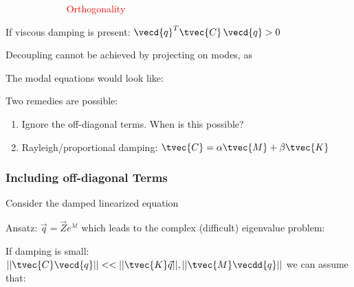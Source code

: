 \documentclass[10pt,a4paper]{scrartcl}
\begin{document}
\begin{multicols*}{2}

\textcolor{red}{$\qquad\qquad\qquad$ Orthogonality}


If viscous damping is present: $\vecd{q}^T\tvec{C}\,\vecd{q}>0$


Decoupling cannot be achieved by projecting on modes, as


The modal equations would look like:


Two remedies are possible:

\begin{enumerate}
\item Ignore the off-diagonal terms. When is this possible?
\item Rayleigh/proportional damping: $\tvec{C}=\alpha\tvec{M}+\beta\tvec{K}$
\end{enumerate}

\subsubsection{Including off-diagonal Terms}

Consider the damped linearized equation


Ansatz: $\vec{q}=\vec{Z}e^{\lambda t}$ which leads to the complex (difficult) eigenvalue problem:


If damping is small: $||\tvec{C}\vecd{q}||<<||\tvec{K}\vec{q}||,||\tvec{M}\vecdd{q}||$ we can assume that:


\end{multicols*}
\end{document}
